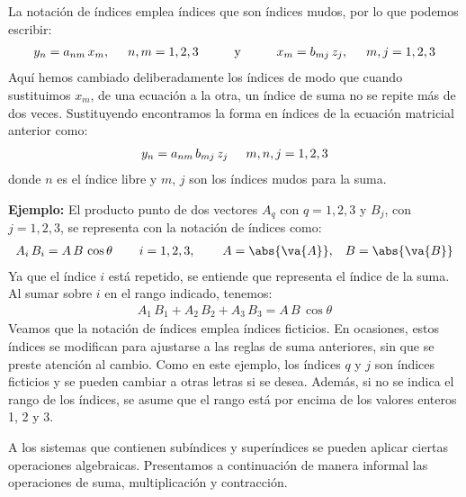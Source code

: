 La notación de índices emplea índices que son índices mudos, por lo que podemos escribir:
\begin{align*}
y_{n} = a_{nm} \, x_{m}, \hspace{0.5cm} n, m = 1, 2, 3 \hspace{1cm} \mbox{y} \hspace{1cm} x_{m} = b_{mj} \, z_{j}, \hspace{0.5cm} m, j = 1, 2, 3
\end{align*}
Aquí hemos cambiado deliberadamente los índices de modo que cuando sustituimos $x_{m}$, de una ecuación a la otra, un índice de suma no se repite más de dos veces. Sustituyendo encontramos la forma en índices de la ecuación matricial anterior como:
\begin{align*}
y_{n} = a_{nm} \, b_{mj} \, z_{j} \hspace{0.5cm} m, n, j = 1, 2, 3
\end{align*}
donde $n$ es el índice libre y $m$, $j$ son los índices mudos para la suma.
\par
\noindent
\textbf{Ejemplo: } El producto punto de dos vectores $A_{q}$ con $q = 1, 2, 3$ y $B_{j}$, con $j = 1, 2, 3$, se representa con la notación de índices como:
\begin{align*}
A_{i} \, B_{i} = A \, B \, \cos \theta \hspace{0.75cm} i = 1, 2, 3, \hspace{0.75cm} A = \abs{\va{A}}, \hspace{0.3cm} B = \abs{\va{B}}
\end{align*}
Ya que el índice $i$ está repetido, se entiende que representa el índice de la suma. Al sumar sobre $i$ en el rango indicado, tenemos:
\begin{align*}
A_{1} \, B_{1} + A_{2} \, B_{2} + A_{3} \, B_{3} = A \, B \, \cos \theta
\end{align*}
Veamos que la notación de índices emplea índices ficticios. En ocasiones, estos índices se modifican para ajustarse a las reglas de suma anteriores, sin que se preste atención al cambio. Como en este ejemplo, los índices $q$ y $j$ son índices ficticios y se pueden cambiar a otras letras si se desea. Además, si no se indica el rango de los índices, se asume que el rango está por encima de los valores enteros 1, 2 y 3.
\par
A los sistemas que contienen subíndices y superíndices se pueden aplicar ciertas operaciones algebraicas. Presentamos a continuación de manera informal las operaciones de suma, multiplicación y contracción.

